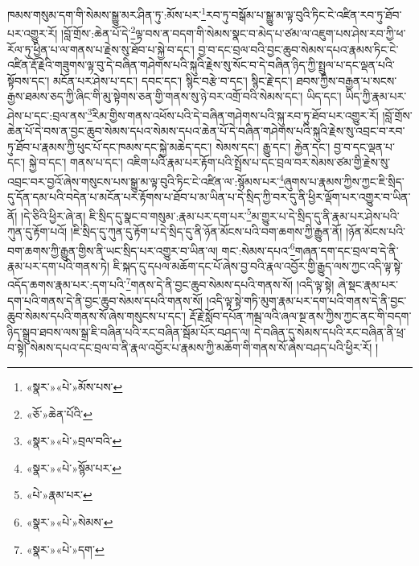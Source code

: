 ཁམས་གསུམ་དག་གི་སེམས་སྒྱུ་མར་ཤིན་ཏུ་:མོས་པར་\footnote{«སྣར་»«པེ་»མོས་པས་}རབ་ཏུ་བསྒོམ་པ་སྒྱུ་མ་ལྟ་བུའི་ཏིང་ངེ་འཛིན་རབ་ཏུ་ཐོབ་པར་འགྱུར་རོ། །བློ་གྲོས་:ཆེན་པོ་དེ་\footnote{«ཅོ་»ཆེན་པོའི་}ལྟ་བས་ན་བདག་གི་སེམས་སྣང་བ་མེད་པ་ཙམ་ལ་འཇུག་པས་ཤེས་རབ་ཀྱི་ཕ་རོལ་ཏུ་ཕྱིན་པ་ལ་གནས་པ་རྗེས་སུ་ཐོབ་པ་སྐྱེ་བ་དང་། བྱ་བ་དང་བྲལ་བའི་བྱང་ཆུབ་སེམས་དཔའ་རྣམས་ཏིང་ངེ་འཛིན་རྡོ་རྗེའི་གཟུགས་ལྟ་བུ་དེ་བཞིན་གཤེགས་པའི་སྐུའི་རྗེས་སུ་སོང་བ་དེ་བཞིན་ཉིད་ཀྱི་སྤྲུལ་པ་དང་ལྡན་པའི་སྟོབས་དང་། མངོན་པར་ཤེས་པ་དང་། དབང་དང་། སྙིང་བརྩེ་བ་དང་། སྙིང་རྗེ་དང་། ཐབས་ཀྱིས་བརྒྱན་པ་སངས་རྒྱས་ཐམས་ཅད་ཀྱི་ཞིང་གི་མུ་སྟེགས་ཅན་གྱི་གནས་སུ་ཉེ་བར་འགྲོ་བའི་སེམས་དང་། ཡིད་དང་། ཡིད་ཀྱི་རྣམ་པར་ཤེས་པ་དང་:བྲལ་ནས་\footnote{«སྣར་»«པེ་»བྲལ་བའི་}རིམ་གྱིས་གནས་འཕོས་པའི་དེ་བཞིན་གཤེགས་པའི་སྐུ་རབ་ཏུ་ཐོབ་པར་འགྱུར་རོ། །བློ་གྲོས་ཆེན་པོ་དེ་བས་ན་བྱང་ཆུབ་སེམས་དཔའ་སེམས་དཔའ་ཆེན་པོ་དེ་བཞིན་གཤེགས་པའི་སྐུའི་རྗེས་སུ་འབྲང་བ་རབ་ཏུ་ཐོབ་པ་རྣམས་ཀྱི་ཕུང་པོ་དང་ཁམས་དང་སྐྱེ་མཆེད་དང་། སེམས་དང་། རྒྱུ་དང་། རྐྱེན་དང་། བྱ་བ་དང་ལྡན་པ་དང་། སྐྱེ་བ་དང་། གནས་པ་དང་། འཇིག་པའི་རྣམ་པར་རྟོག་པའི་སྤྲོས་པ་དང་བྲལ་བར་སེམས་ཙམ་གྱི་རྗེས་སུ་འབྲང་བར་བྱའོ་ཞེས་གསུངས་པས་སྒྱུ་མ་ལྟ་བུའི་ཏིང་ངེ་འཛིན་ལ་:སྙོམས་པར་\footnote{«སྣར་»«པེ་»སྙོམ་པར་}ཞུགས་པ་རྣམས་ཀྱིས་ཀྱང་ཇི་སྲིད་དུ་དོན་དམ་པའི་བདེན་པ་མངོན་པར་རྟོགས་པ་ཐོབ་པ་མ་ཡིན་པ་དེ་སྲིད་ཀྱི་བར་དུ་ནི་ཕྱིར་ལྡོག་པར་འགྱུར་བ་ཡིན་ནོ། །དེ་ཅིའི་ཕྱིར་ཞེ་ན། ཇི་སྲིད་དུ་སྣང་བ་གསུམ་:རྣམ་པར་དག་པར་\footnote{«པེ་»རྣམ་པར་}མ་གྱུར་པ་དེ་སྲིད་དུ་ནི་རྣམ་པར་ཤེས་པའི་ཀུན་དུ་རྟོག་པའོ། །ཇི་སྲིད་དུ་ཀུན་དུ་རྟོག་པ་དེ་སྲིད་དུ་ནི་ཉོན་མོངས་པའི་བག་ཆགས་ཀྱི་རྒྱུན་ནོ། །ཉོན་མོངས་པའི་བག་ཆགས་ཀྱི་རྒྱུན་གྱིས་ནི་ཡང་སྲིད་པར་འགྱུར་བ་ཡིན་ལ། གང་:སེམས་དཔའ་\footnote{«སྣར་»«པེ་»སེམས་}གཞན་དག་དང་བྲལ་བ་དེ་ནི་རྣམ་པར་དག་པའི་གནས་ཏེ། ཇི་སྐད་དུ་དཔལ་མཆོག་དང་པོ་ཞེས་བྱ་བའི་རྣལ་འབྱོར་གྱི་རྒྱུད་ལས་ཀྱང་འདི་ལྟ་སྟེ་འདོད་ཆགས་རྣམ་པར་:དག་པའི་\footnote{«སྣར་»«པེ་»དག་}གནས་དེ་ནི་བྱང་ཆུབ་སེམས་དཔའི་གནས་སོ། །འདི་ལྟ་སྟེ། ཞེ་སྡང་རྣམ་པར་དག་པའི་གནས་དེ་ནི་བྱང་ཆུབ་སེམས་དཔའི་གནས་སོ། །འདི་ལྟ་སྟེ་གཏི་མུག་རྣམ་པར་དག་པའི་གནས་དེ་ནི་བྱང་ཆུབ་སེམས་དཔའི་གནས་སོ་ཞེས་གསུངས་པ་དང་། རྡོ་རྗེ་སློབ་དཔོན་ཀམྦ་ལའི་ཞལ་སྔ་ནས་ཀྱིས་ཀྱང་ནང་གི་བདག་ཉིད་སྒྲུབ་ཐབས་ལས་སྒྲ་ཇི་བཞིན་པའི་རང་བཞིན་སྦོམ་པོར་བཤད་ལ། དེ་བཞིན་དུ་སེམས་དཔའི་རང་བཞིན་ནི་ཕྲ་བ་སྟེ། སེམས་དཔའ་དང་བྲལ་བ་ནི་རྣལ་འབྱོར་པ་རྣམས་ཀྱི་མཆོག་གི་གནས་སོ་ཞེས་བཤད་པའི་ཕྱིར་རོ། །
